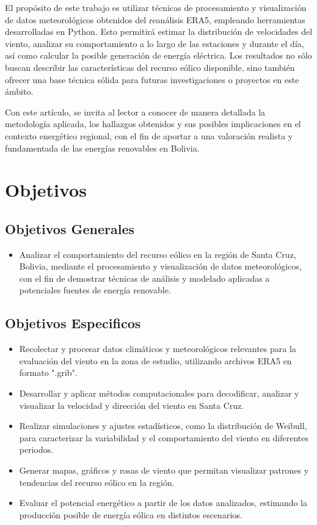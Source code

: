 \documentclass[a4paper,12pt]{article}
\begin{document}
		El propósito de este trabajo es utilizar técnicas de procesamiento y visualización de datos meteorológicos obtenidos del reanálisis ERA5, empleando herramientas desarrolladas en Python. Esto permitirá estimar la distribución de velocidades del viento, analizar su comportamiento a lo largo de las estaciones y durante el día, así como calcular la posible generación de energía eléctrica. Los resultados no sólo buscan describir las características del recurso eólico disponible, sino también ofrecer una base técnica sólida para futuras investigaciones o proyectos en este ámbito.
		
		Con este artículo, se invita al lector a conocer de manera detallada la metodología aplicada, los hallazgos obtenidos y sus posibles implicaciones en el contexto energético regional, con el fin de aportar a una valoración realista y fundamentada de las energías renovables en Bolivia.
		
	\section{Objetivos}
		\subsection{Objetivos Generales}
			\begin{itemize}
				\item Analizar el comportamiento del recurso eólico en la región de Santa Cruz, Bolivia, mediante el procesamiento y visualización de datos meteorológicos, con el fin de demostrar técnicas de análisis y modelado aplicadas a potenciales fuentes de energía renovable.
			\end{itemize}
		\subsection{Objetivos Especificos}
			\begin{itemize}
				\item Recolectar y procesar datos climáticos y meteorológicos relevantes para la evaluación del viento en la zona de estudio, utilizando archivos ERA5 en formato ".grib".
				\item Desarrollar y aplicar métodos computacionales para decodificar, analizar y visualizar la velocidad y dirección del viento en Santa Cruz.
				\item Realizar simulaciones y ajustes estadísticos, como la distribución de Weibull, para caracterizar la variabilidad y el comportamiento del viento en diferentes periodos.
				\item Generar mapas, gráficos y rosas de viento que permitan visualizar patrones y tendencias del recurso eólico en la región.
				\item Evaluar el potencial energético a partir de los datos analizados, estimando la producción posible de energía eólica en distintos escenarios.
			\end{itemize}
\end{document}
